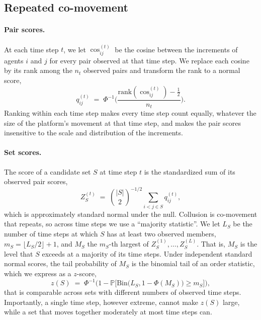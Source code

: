 \documentclass{article}
\theoremstyle{plain}
\theoremstyle{definition}
\newcommand{\Prob}{\mathbb{P}}
\begin{document}
\subsection{Repeated co-movement}
\label{sec:stat}

\paragraph{Pair scores.} At each time step $t$, we let $\cos_{ij}^{(t)}$ be the cosine between the increments of agents $i$ and $j$ for every pair observed at that time step. We replace each cosine by its rank among the $n_t$ observed pairs and transform the rank to a normal score,
\begin{equation}
\label{eq:pairscore}
q_{ij}^{(t)} \;=\; \Phi^{-1}\!\Big(\frac{\mathrm{rank}(\cos_{ij}^{(t)}) - \tfrac12}{n_t}\Big).
\end{equation}
Ranking within each time step makes every time step count equally, whatever the size of the platform's movement at that time step, and makes the pair scores insensitive to the scale and distribution of the increments.

\paragraph{Set scores.} The score of a candidate set $S$ at time step $t$ is the standardized sum of its observed pair scores,
\begin{equation}
\label{eq:setscore}
Z_S^{(t)} \;=\; \binom{|S|}{2}^{-1/2}\sum_{i<j\in S} q_{ij}^{(t)},
\end{equation}
which is approximately standard normal under the null. Collusion is co-movement that repeats, so across time steps we use a ``majority statistic''. We let $L_S$ be the number of time steps at which $S$ has at least two observed members, $m_S=\lfloor L_S/2\rfloor+1$, and $M_S$ the $m_S$-th largest of $Z_S^{(1)},\dots,Z_S^{(L)}$. That is, $M_S$ is the level that $S$ exceeds at a majority of its time steps. Under independent standard normal scores, the tail probability of $M_S$ is the binomial tail of an order statistic, which we express as a $z$-score,
\begin{equation}
\label{eq:majority}
z(S) \;=\; \Phi^{-1}\Big(1 - \Prob\big[\mathrm{Bin}\big(L_S, 1-\Phi(M_S)\big)\ge m_S\big]\Big),
\end{equation}
that is comparable across sets with different numbers of observed time steps. Importantly, a single time step, however extreme, cannot make $z(S)$ large, while a set that moves together moderately at most time steps can.
\end{document}
